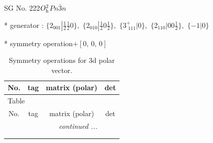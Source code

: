 \documentclass[fleqn,8pt]{jsarticle}
\begin{document}
\setcounter{MaxMatrixCols}{32}

\renewcommand{\tablename}{Table~}
\renewcommand{\figurename}{Figure~}
\begin{center}
\LARGE
SG No. 222\quad$O_{\rm h}^{2}$\quad$Pn\bar{3}n$\quad[ cubic ]
\end{center}

* generator : $\{2{}_{001}|\frac{1}{2} \frac{1}{2} 0\},\,\,\{2{}_{010}|\frac{1}{2} 0 \frac{1}{2}\},\,\,\{3^{+}_{\,\,111}|0\},\,\,\{2{}_{110}|0 0 \frac{1}{2}\},\,\,\{-1|0\}$

* symmetry operation\quad$+\left[ 0,\, 0,\, 0 \right]$
\renewcommand{\arraystretch}{1.3}
\begin{longtable}{cccc}
\caption{Symmetry operations for 3d polar vector.}
 \\
 \hline \hline
No. & tag & matrix (polar) & det \\ \hline \endfirsthead

\multicolumn{3}{l}{\tablename\ \thetable{}} \\
 \hline \hline
No. & tag & matrix (polar) & det \\ \hline \endhead

 \hline \hline
\multicolumn{3}{r}{\footnotesize\it continued ...} \\ \endfoot

 \hline \hline
\multicolumn{3}{r}{} \\ \endlastfoot


\end{longtable}
\end{document}
